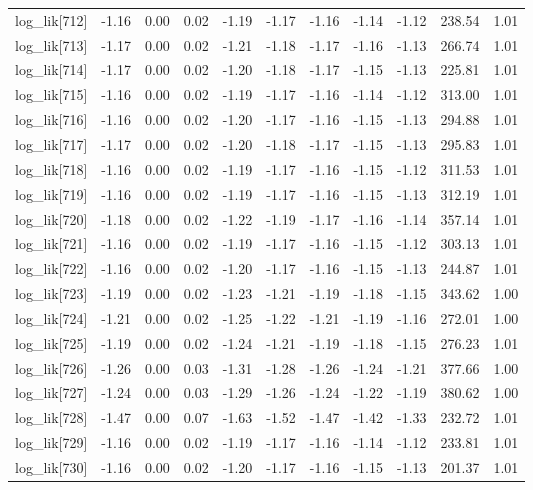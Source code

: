 \begin{table}[ht]
\begin{tabular}{rrrrrrrrrrr}
  log\_lik[712] & -1.16 & 0.00 & 0.02 & -1.19 & -1.17 & -1.16 & -1.14 & -1.12 & 238.54 & 1.01 \\ 
  log\_lik[713] & -1.17 & 0.00 & 0.02 & -1.21 & -1.18 & -1.17 & -1.16 & -1.13 & 266.74 & 1.01 \\ 
  log\_lik[714] & -1.17 & 0.00 & 0.02 & -1.20 & -1.18 & -1.17 & -1.15 & -1.13 & 225.81 & 1.01 \\ 
  log\_lik[715] & -1.16 & 0.00 & 0.02 & -1.19 & -1.17 & -1.16 & -1.14 & -1.12 & 313.00 & 1.01 \\ 
  log\_lik[716] & -1.16 & 0.00 & 0.02 & -1.20 & -1.17 & -1.16 & -1.15 & -1.13 & 294.88 & 1.01 \\ 
  log\_lik[717] & -1.17 & 0.00 & 0.02 & -1.20 & -1.18 & -1.17 & -1.15 & -1.13 & 295.83 & 1.01 \\ 
  log\_lik[718] & -1.16 & 0.00 & 0.02 & -1.19 & -1.17 & -1.16 & -1.15 & -1.12 & 311.53 & 1.01 \\ 
  log\_lik[719] & -1.16 & 0.00 & 0.02 & -1.19 & -1.17 & -1.16 & -1.15 & -1.13 & 312.19 & 1.01 \\ 
  log\_lik[720] & -1.18 & 0.00 & 0.02 & -1.22 & -1.19 & -1.17 & -1.16 & -1.14 & 357.14 & 1.01 \\ 
  log\_lik[721] & -1.16 & 0.00 & 0.02 & -1.19 & -1.17 & -1.16 & -1.15 & -1.12 & 303.13 & 1.01 \\ 
  log\_lik[722] & -1.16 & 0.00 & 0.02 & -1.20 & -1.17 & -1.16 & -1.15 & -1.13 & 244.87 & 1.01 \\ 
  log\_lik[723] & -1.19 & 0.00 & 0.02 & -1.23 & -1.21 & -1.19 & -1.18 & -1.15 & 343.62 & 1.00 \\ 
  log\_lik[724] & -1.21 & 0.00 & 0.02 & -1.25 & -1.22 & -1.21 & -1.19 & -1.16 & 272.01 & 1.00 \\ 
  log\_lik[725] & -1.19 & 0.00 & 0.02 & -1.24 & -1.21 & -1.19 & -1.18 & -1.15 & 276.23 & 1.01 \\ 
  log\_lik[726] & -1.26 & 0.00 & 0.03 & -1.31 & -1.28 & -1.26 & -1.24 & -1.21 & 377.66 & 1.00 \\ 
  log\_lik[727] & -1.24 & 0.00 & 0.03 & -1.29 & -1.26 & -1.24 & -1.22 & -1.19 & 380.62 & 1.00 \\ 
  log\_lik[728] & -1.47 & 0.00 & 0.07 & -1.63 & -1.52 & -1.47 & -1.42 & -1.33 & 232.72 & 1.01 \\ 
  log\_lik[729] & -1.16 & 0.00 & 0.02 & -1.19 & -1.17 & -1.16 & -1.14 & -1.12 & 233.81 & 1.01 \\ 
  log\_lik[730] & -1.16 & 0.00 & 0.02 & -1.20 & -1.17 & -1.16 & -1.15 & -1.13 & 201.37 & 1.01 \\ 

\end{tabular}
\end{table}
